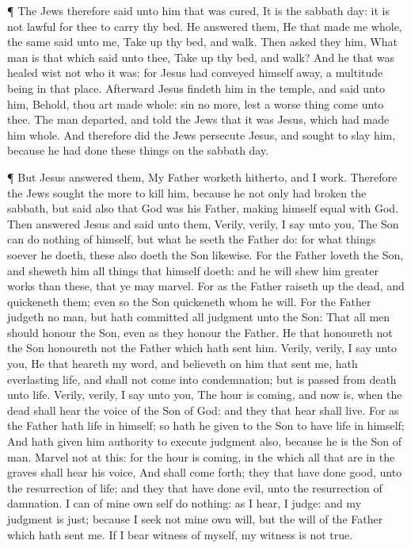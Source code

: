  ¶ The Jews therefore said unto him that was cured, It is
the sabbath day: it is not lawful for thee to carry thy bed.
 He answered them, He that made me whole, the same said
unto me, Take up thy bed, and walk.  Then asked they him,
What man is that which said unto thee, Take up thy bed, and walk?
 And he that was healed wist not who it was: for Jesus had
conveyed himself away, a multitude being in that place. 
Afterward Jesus findeth him in the temple, and said unto him, Behold,
thou art made whole: sin no more, lest a worse thing come unto thee.
 The man departed, and told the Jews that it was Jesus,
which had made him whole.  And therefore did the Jews
persecute Jesus, and sought to slay him, because he had done these
things on the sabbath day.

 ¶ But Jesus answered them, My Father worketh hitherto, and
I work.  Therefore the Jews sought the more to kill him,
because he not only had broken the sabbath, but said also that God was
his Father, making himself equal with God.  Then answered
Jesus and said unto them, Verily, verily, I say unto you, The Son can do
nothing of himself, but what he seeth the Father do: for what things
soever he doeth, these also doeth the Son likewise.  For
the Father loveth the Son, and sheweth him all things that himself
doeth: and he will shew him greater works than these, that ye may
marvel.  For as the Father raiseth up the dead, and
quickeneth them; even so the Son quickeneth whom he will. 
For the Father judgeth no man, but hath committed all judgment unto the
Son:  That all men should honour the Son, even as they
honour the Father. He that honoureth not the Son honoureth not the
Father which hath sent him.  Verily, verily, I say unto
you, He that heareth my word, and believeth on him that sent me, hath
everlasting life, and shall not come into condemnation; but is passed
from death unto life.  Verily, verily, I say unto you, The
hour is coming, and now is, when the dead shall hear the voice of the
Son of God: and they that hear shall live.  For as the
Father hath life in himself; so hath he given to the Son to have life in
himself;  And hath given him authority to execute judgment
also, because he is the Son of man.  Marvel not at this:
for the hour is coming, in the which all that are in the graves shall
hear his voice,  And shall come forth; they that have done
good, unto the resurrection of life; and they that have done evil, unto
the resurrection of damnation.  I can of mine own self do
nothing: as I hear, I judge: and my judgment is just; because I seek not
mine own will, but the will of the Father which hath sent me.
 If I bear witness of myself, my witness is not true.

